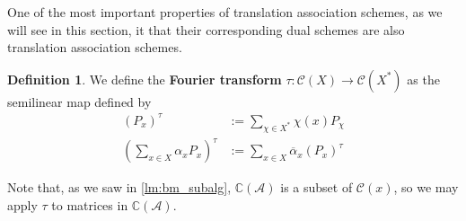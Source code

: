 \documentclass[a4paper,12pt]{article}
\theoremstyle{plain}
\theoremstyle{definition}
\newtheorem{definition}[theorem]{Definition}
\theoremstyle{remark}
\begin{document}
One of the most important properties of translation association schemes, as we
will see in this section, it that their corresponding dual schemes are also
translation association schemes.

\begin{definition}
    We define the \textbf{Fourier transform}
    $ \tau : \mathcal{C}(X) \rightarrow \mathcal{C}(X^*) $
    as the semilinear map defined by
    \begin{equation*}
        \begin{split}
            (P_x)^{\tau} &:= \sum_{ \chi\in X^* } \chi(x)P_{\chi} \\
            (\sum_{ x \in X }\alpha_xP_x)^{\tau} &:= \sum_{x \in X}
                \overline{\alpha}_x(P_{x})^{\tau}
        \end{split}
    \end{equation*}
\end{definition}

Note that, as we saw in \ref{lm:bm_subalg}, $ \mathbb{C}(\mathcal{A}) $ is a subset
of $ \mathcal{C}(x)$, so we may apply $ \tau $ to matrices in
$ \mathbb{C}(\mathcal{A}) $.
\end{document}
